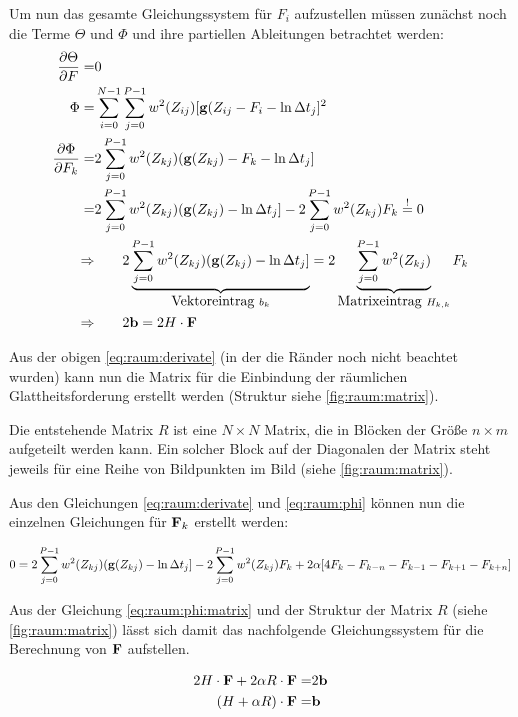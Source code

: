 Um nun das gesamte Gleichungssystem für $F_i$ aufzustellen müssen zunächst noch die Terme $\Theta$ und $\Phi$ und ihre partiellen Ableitungen betrachtet werden:
\begin{align}
\frac{\partial \Theta}{\partial F} =& 0\\
\Phi =&\sum_{i=0}^{N-1} \sum_{j=0}^{P-1} w^2(Z_{ij})[\mathbf g(Z_{ij} - F_i - \ln \Delta t_j]^2\\
\frac{\partial \Phi}{\partial F_k} =& 2 \sum_{j=0}^{P-1} w^2(Z_{kj})(\mathbf g(Z_{kj}) -F_k-\ln \Delta t_j]\\
\label{eq:raum:phi}
=& 2 \sum_{j=0}^{P-1} w^2(Z_{kj})(\mathbf g(Z_{kj}) -\ln \Delta t_j] - 2 \sum_{j=0}^{P-1} w^2(Z_{kj})F_k \overset{!}{=}0\\
\Rightarrow & \qquad 2 \underbrace{\sum_{j=0}^{P-1} w^2(Z_{kj})(\mathbf g(Z_{kj}) -\ln \Delta t_j]}_{\mbox{Vektoreintrag }b_k} = 2 \underbrace{\sum_{j=0}^{P-1} w^2(Z_{kj})}_{\mbox{Matrixeintrag } H_{k,k}}F_k\\
\label{eq:raum:phi:matrix}
\Rightarrow & \qquad 2 \mathbf b = 2 H \cdot \mathbf F
\end{align}


Aus der obigen \autoref{eq:raum:derivate} (in der die Ränder noch nicht beachtet wurden) kann nun die Matrix für die Einbindung der räumlichen Glattheitsforderung erstellt werden (Struktur siehe \autoref{fig:raum:matrix}).

Die entstehende Matrix $R$ ist eine $N \times N$ Matrix, die in Blöcken der Größe $n \times m$ aufgeteilt werden kann. Ein solcher Block auf der Diagonalen der Matrix  steht jeweils für eine Reihe von Bildpunkten im Bild (siehe \autoref{fig:raum:matrix}). 

Aus den Gleichungen \ref{eq:raum:derivate} und \ref{eq:raum:phi} können nun die einzelnen Gleichungen für $\mathbf F_k$ erstellt werden:

\begin{align}
 0 = 2 \sum_{j=0}^{P-1} w^2(Z_{kj})(\mathbf g(Z_{kj}) -\ln \Delta t_j] - 2 \sum_{j=0}^{P-1} w^2(Z_{kj})F_k + 2\alpha [4 F_k-F_{k-n} - F_{k-1} - F_{k+1} - F_{k+n}]
\end{align}

Aus der Gleichung \ref{eq:raum:phi:matrix} und der Struktur der Matrix $R$ (siehe \autoref{fig:raum:matrix}) lässt sich damit das nachfolgende Gleichungssystem für die Berechnung von $\mathbf F$ aufstellen. 

\begin{align}
2 H \cdot \mathbf F + 2 \alpha R\cdot \mathbf F =& 2 \mathbf b \\
\label{eq:raum:res}
(H+\alpha R)\cdot \mathbf F =& \mathbf b
\end{align}

